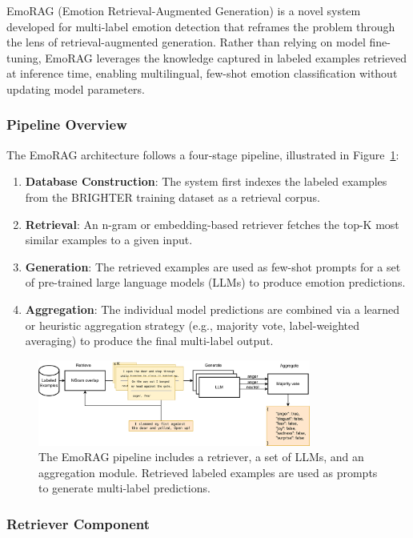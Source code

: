 \documentclass[a4paper,12pt]{extarticle}
\begin{document}
EmoRAG (Emotion Retrieval-Augmented Generation) is a novel system developed for multi-label emotion detection that reframes the problem through the lens of retrieval-augmented generation. Rather than relying on model fine-tuning, EmoRAG leverages the knowledge captured in labeled examples retrieved at inference time, enabling multilingual, few-shot emotion classification without updating model parameters.

\subsubsection{Pipeline Overview}

The EmoRAG architecture follows a four-stage pipeline, illustrated in Figure~\ref{fig:emorag_pipeline}:

\begin{enumerate}
\item \textbf{Database Construction}: The system first indexes the labeled examples from the BRIGHTER training dataset as a retrieval corpus.
\item \textbf{Retrieval}: An n-gram or embedding-based retriever fetches the top-K most similar examples to a given input.
\item \textbf{Generation}: The retrieved examples are used as few-shot prompts for a set of pre-trained large language models (LLMs) to produce emotion predictions.
\item \textbf{Aggregation}: The individual model predictions are combined via a learned or heuristic aggregation strategy (e.g., majority vote, label-weighted averaging) to produce the final multi-label output.
\end{enumerate}


\begin{figure}[h]
    \centering
    \includegraphics[width=0.8\textwidth]{emorag.png}
    \caption{The EmoRAG pipeline includes a retriever, a set of LLMs, and an aggregation module. Retrieved labeled examples are used as prompts to generate multi-label predictions.}
    \label{fig:emorag_pipeline}
\end{figure}

\subsubsection{Retriever Component}
\end{document}

